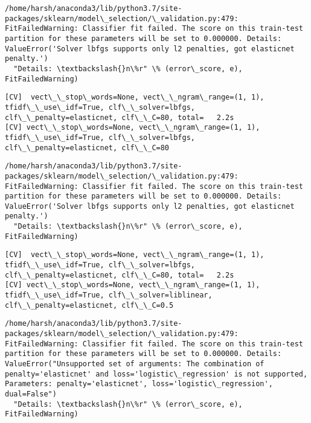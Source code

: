 \documentclass[11pt]{article}
\begin{document}
    \begin{Verbatim}[commandchars=\\\{\}]
/home/harsh/anaconda3/lib/python3.7/site-packages/sklearn/model\_selection/\_validation.py:479: FitFailedWarning: Classifier fit failed. The score on this train-test partition for these parameters will be set to 0.000000. Details: 
ValueError('Solver lbfgs supports only l2 penalties, got elasticnet penalty.')
  "Details: \textbackslash{}n\%r" \% (error\_score, e), FitFailedWarning)

    \end{Verbatim}

    \begin{Verbatim}[commandchars=\\\{\}]
[CV]  vect\_\_stop\_words=None, vect\_\_ngram\_range=(1, 1), tfidf\_\_use\_idf=True, clf\_\_solver=lbfgs, clf\_\_penalty=elasticnet, clf\_\_C=80, total=   2.2s
[CV] vect\_\_stop\_words=None, vect\_\_ngram\_range=(1, 1), tfidf\_\_use\_idf=True, clf\_\_solver=lbfgs, clf\_\_penalty=elasticnet, clf\_\_C=80 

    \end{Verbatim}

    \begin{Verbatim}[commandchars=\\\{\}]
/home/harsh/anaconda3/lib/python3.7/site-packages/sklearn/model\_selection/\_validation.py:479: FitFailedWarning: Classifier fit failed. The score on this train-test partition for these parameters will be set to 0.000000. Details: 
ValueError('Solver lbfgs supports only l2 penalties, got elasticnet penalty.')
  "Details: \textbackslash{}n\%r" \% (error\_score, e), FitFailedWarning)

    \end{Verbatim}

    \begin{Verbatim}[commandchars=\\\{\}]
[CV]  vect\_\_stop\_words=None, vect\_\_ngram\_range=(1, 1), tfidf\_\_use\_idf=True, clf\_\_solver=lbfgs, clf\_\_penalty=elasticnet, clf\_\_C=80, total=   2.2s
[CV] vect\_\_stop\_words=None, vect\_\_ngram\_range=(1, 1), tfidf\_\_use\_idf=True, clf\_\_solver=liblinear, clf\_\_penalty=elasticnet, clf\_\_C=0.5 

    \end{Verbatim}

    \begin{Verbatim}[commandchars=\\\{\}]
/home/harsh/anaconda3/lib/python3.7/site-packages/sklearn/model\_selection/\_validation.py:479: FitFailedWarning: Classifier fit failed. The score on this train-test partition for these parameters will be set to 0.000000. Details: 
ValueError("Unsupported set of arguments: The combination of penalty='elasticnet' and loss='logistic\_regression' is not supported, Parameters: penalty='elasticnet', loss='logistic\_regression', dual=False")
  "Details: \textbackslash{}n\%r" \% (error\_score, e), FitFailedWarning)

    \end{Verbatim}
\end{document}
